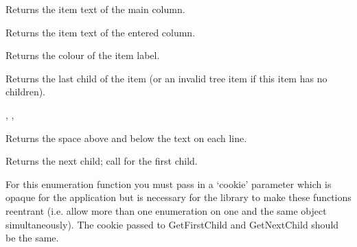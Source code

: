 \label{wxtreelistctrlgetitemtext}


Returns the item text of the main column.


Returns the item text of the entered column.

\label{wxtreelistctrlgetitemtextcolour}


Returns the colour of the item label.

\label{wxtreelistctrlgetlastchild}


Returns the last child of the item (or an invalid tree item if this item has no children).


,
,

\label{wxtreelistctrlgetlinespacing}


Returns the space above and below the text on each line.

\label{wxtreelistctrlgetnextchild}


Returns the next child; call  for the first child.

For this enumeration function you must pass in a `cookie' parameter
which is opaque for the application but is necessary for the library
to make these functions reentrant (i.e. allow more than one
enumeration on one and the same object simultaneously). The cookie passed to
GetFirstChild and GetNextChild should be the same.

